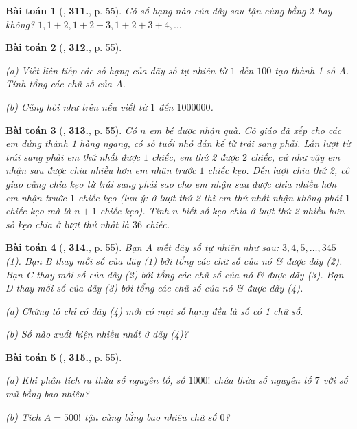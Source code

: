 \documentclass{article}
\numberwithin{equation}{section}
\newtheorem{baitoan}{Bài toán}
\begin{document}
\begin{baitoan}[\cite{Binh_Toan_6_tap_1}, \textbf{311.}, p. 55]
	Có số hạng nào của dãy sau tận cùng bằng $2$ hay không? $1, 1 + 2, 1 + 2 + 3, 1 + 2 + 3 + 4,\ldots$
\end{baitoan}

\begin{baitoan}[\cite{Binh_Toan_6_tap_1}, \textbf{312.}, p. 55]
	\begin{enumerate*}
		\item[(a)] Viết liên tiếp các số hạng của dãy số tự nhiên từ $1$ đến $100$ tạo thành 1 số $A$. Tính tổng các chữ số của $A$.
		\item[(b)] Cũng hỏi như trên nếu viết từ $1$ đến $1000000$.
	\end{enumerate*}
\end{baitoan}

\begin{baitoan}[\cite{Binh_Toan_6_tap_1}, \textbf{313.}, p. 55]
	Có $n$ em bé được nhận quà. Cô giáo đã xếp cho các em đứng thành 1 hàng ngang, có số tuổi nhỏ dần kể từ trái sang phải. Lần lượt từ trái sang phải em thứ nhất được $1$ chiếc, em thứ 2 được $2$ chiếc, cứ như vậy em nhận sau được chia nhiều hơn em nhận trước $1$ chiếc kẹo. Đến lượt chia thứ 2, cô giao cũng chia kẹo từ trái sang phải sao cho em nhận sau được chia nhiều hơn em nhận trước $1$ chiếc kẹo (lưu ý: ở lượt thứ 2 thì em thứ nhất nhận không phải $1$ chiếc kẹo mà là $n + 1$ chiếc kẹo). Tính $n$ biết số kẹo chia ở lượt thứ 2 nhiều hơn số kẹo chia ở lượt thứ nhất là $36$ chiếc. 
\end{baitoan}

\begin{baitoan}[\cite{Binh_Toan_6_tap_1}, \textbf{314.}, p. 55]
	Bạn A viết dãy số tự nhiên như sau: $3,4,5,\ldots,345$ (1). Bạn B thay mỗi số của dãy (1) bởi tổng các chữ số của nó \& được dãy (2). Bạn C thay mỗi số của dãy (2) bởi tổng các chữ số của nó \& được dãy (3). Bạn D thay mỗi số của dãy (3) bởi tổng các chữ số của nó \& được dãy (4).
	\begin{enumerate*}
		\item[(a)] Chứng tỏ chỉ có dãy (4) mới có mọi số hạng đều là số có 1 chữ số.
		\item[(b)] Số nào xuất hiện nhiều nhất ở dãy (4)?
	\end{enumerate*}
\end{baitoan}

\begin{baitoan}[\cite{Binh_Toan_6_tap_1}, \textbf{315.}, p. 55]
	\begin{enumerate*}
		\item[(a)] Khi phân tích ra thừa số nguyên tố, số $1000!$ chứa thừa số nguyên tố $7$ với số mũ bằng bao nhiêu?
		\item[(b)] Tích $A = 500!$ tận cùng bằng bao nhiêu chữ số $0$?
	\end{enumerate*}	
\end{baitoan}
\end{document}
